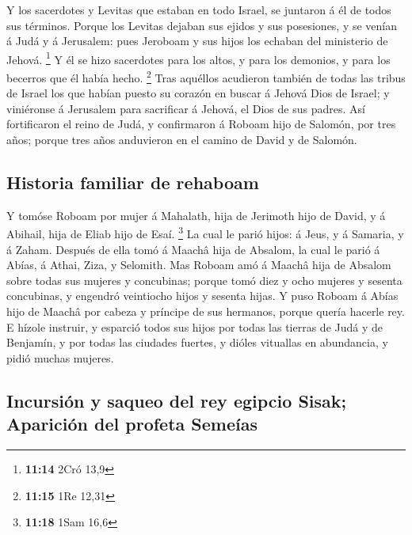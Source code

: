  Y los sacerdotes y Levitas que estaban en todo Israel,
se juntaron á él de todos sus términos.  Porque los
Levitas dejaban sus ejidos y sus posesiones, y se venían á Judá y á
Jerusalem: pues Jeroboam y sus hijos los echaban del ministerio de
Jehová. \footnote{\textbf{11:14} 2Cró 13,9}  Y él se hizo
sacerdotes para los altos, y para los demonios, y para los becerros que
él había hecho. \footnote{\textbf{11:15} 1Re 12,31}  Tras
aquéllos acudieron también de todas las tribus de Israel los que habían
puesto su corazón en buscar á Jehová Dios de Israel; y viniéronse á
Jerusalem para sacrificar á Jehová, el Dios de sus padres.
 Así fortificaron el reino de Judá, y confirmaron á
Roboam hijo de Salomón, por tres años; porque tres años anduvieron en el
camino de David y de Salomón.

\hypertarget{historia-familiar-de-rehaboam}{%
\subsection{Historia familiar de
rehaboam}\label{historia-familiar-de-rehaboam}}

 Y tomóse Roboam por mujer á Mahalath, hija de Jerimoth
hijo de David, y á Abihail, hija de Eliab hijo de Esaí. \footnote{\textbf{11:18}
  1Sam 16,6}  La cual le parió hijos: á Jeus, y á
Samaria, y á Zaham.  Después de ella tomó á Maachâ hija
de Absalom, la cual le parió á Abías, á Athai, Ziza, y Selomith.
 Mas Roboam amó á Maachâ hija de Absalom sobre todas sus
mujeres y concubinas; porque tomó diez y ocho mujeres y sesenta
concubinas, y engendró veintiocho hijos y sesenta hijas. 
Y puso Roboam á Abías hijo de Maachâ por cabeza y príncipe de sus
hermanos, porque quería hacerle rey.  E hízole instruir,
y esparció todos sus hijos por todas las tierras de Judá y de Benjamín,
y por todas las ciudades fuertes, y dióles vituallas en abundancia, y
pidió muchas mujeres.

\hypertarget{incursiuxf3n-y-saqueo-del-rey-egipcio-sisak-apariciuxf3n-del-profeta-semeuxedas}{%
\subsection{Incursión y saqueo del rey egipcio Sisak; Aparición del
profeta
Semeías}\label{incursiuxf3n-y-saqueo-del-rey-egipcio-sisak-apariciuxf3n-del-profeta-semeuxedas}}

